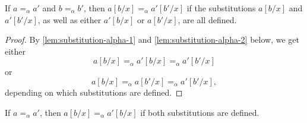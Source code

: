 \documentclass[a4paper, 11pt, article, danish, oneside]{memoir}
\begin{document}
\begin{proposition}
    \label{prop:substitution-alpha-respects}
    If $a =_\alpha a'$ and $b =_\alpha b'$, then $a[b/x] =_\alpha a'[b'/x]$ if the substitutions $a[b/x]$ and $a'[b'/x]$, as well as either $a'[b/x]$ or $a[b'/x]$, are all defined.
\end{proposition}

\begin{proof}
    By \cref{lem:substitution-alpha-1} and \cref{lem:substitution-alpha-2} below, we get either
    \begin{equation*}
        a[b/x]
            =_\alpha a'[b/x]
            =_\alpha a'[b'/x]
    \end{equation*}
    or
    \begin{equation*}
        a[b/x]
            =_\alpha a[b'/x]
            =_\alpha a'[b'/x],
    \end{equation*}
    depending on which substitutions are defined.
\end{proof}


\begin{lemma}
    \label{lem:substitution-alpha-1}
    If $a =_\alpha a'$, then $a[b/x] =_\alpha a'[b/x]$ if both substitutions are defined.
\end{lemma}
\end{document}

